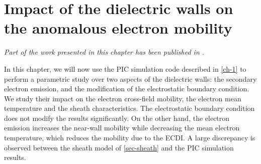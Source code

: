 



\chapter{Impact of the dielectric walls on the anomalous electron mobility }
\label{ch-2}

\begin{Chabstract}

\emph{
Part of the work presented in this chapter has been published in \citet{tavant2018}.}
\end{Chabstract}
\vspace{1ex}

\begin{Chabstract}
In this chapter, we will now use the PIC simulation code described in \cref{ch-1} to perform a parametric study over two aspects of the dielectric walls\string: the secondary electron emission, and the modification of the electrostatic boundary condition.
We study their impact on the electron cross-field mobility, the electron mean temperature and the sheath characteristics.
The electrostatic boundary condition does not modify the results significantly.
On the other hand, the electron emission increases the near-wall mobility while decreasing the mean electron temperature, which reduces the mobility due to the \ac{ECDI}.
A large discrepancy is observed between the sheath model of \cref{sec-sheath} and the PIC simulation results.
\end{Chabstract}



\minitoc


% 
% 
% 
% 
% 
% 
% 










